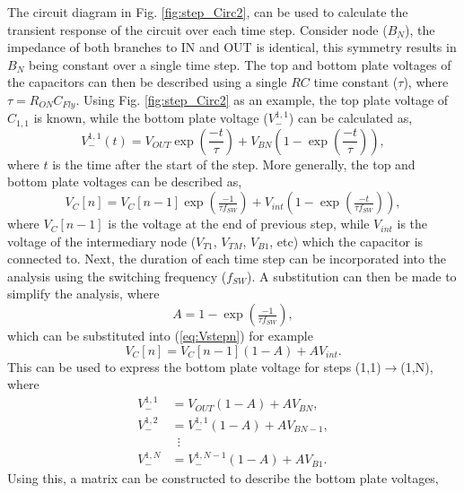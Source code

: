 \documentclass[conference]{IEEEtran}
\begin{document}
	The circuit diagram in Fig. \ref{fig:step_Circ2}, can be used to calculate the transient response of the circuit over each time step. Consider node ($B_N$),  the impedance of both branches to IN and OUT is identical, this symmetry results in $B_N$ being constant over a single time step. The top and bottom plate voltages of the capacitors can then be described using a single $RC$ time constant ($\tau$), where $\tau = R_{ON}C_{Fly}$. Using Fig. \ref{fig:step_Circ2} as an example, the top plate voltage of $C_{1,1}$ is known, while the bottom plate voltage ($V_{-}^{1,1}$) can be calculated as,
	\begin{equation}
	V_{-}^{1,1}(t) = V_{OUT}\exp\left(\frac{-t}{\tau}\right) + V_{BN}\left(1-\exp\left(\frac{-t}{\tau}\right)\right),
	\end{equation}
	where $t$ is the time after the start of the step. More generally, the top and bottom plate voltages can be described as,
	\begin{equation}
	V_{C}[n]\! =\! V_{C}[n\!-\!1]\exp\left(\tfrac{-1}{\tau f_{SW}}\right) + V_{int}\!\left(1-\exp\left(\tfrac{-t}{\tau f_{SW}}\right)\right),
	\label{eq:Vstepn}
	\end{equation}
	where $V_{C}[n-1]$ is the voltage at the end of previous step, while $V_{int}$ is the voltage of the intermediary node ($V_{T1}$, $V_{TM}$, $V_{B1}$, etc) which the capacitor is connected to. Next, the duration of each time step can be incorporated into the analysis using the switching frequency ($f_{SW}$). A substitution can then be made to simplify the analysis, where
	\begin{equation}
	A = 1-\exp\left(\tfrac{-1}{\tau f_{SW}}\right),
	\label{eq:A}
	\end{equation}
	which can be substituted into (\ref{eq:Vstepn}) for example
	\begin{equation}
		V_{C}[n] = V_C[n-1](1-A) + AV_{int}.
	\end{equation}
	This can be used to express the bottom plate voltage for steps (1,1)$\rightarrow $(1,N), where
	\begin{equation}
	\begin{split}
	V_-^{1,1} &= V_{OUT}(1-A) + AV_{BN},\\
	V_-^{1,2} &= V_-^{1,1}(1-A) + AV_{BN-1},\\
	& \,\,\,\vdots\\
	V_{-}^{1,N} &= V_-^{1,N-1}(1-A) + AV_{B1}.
	\end{split}		
	\end{equation}
	Using this, a matrix can be constructed to describe the bottom plate voltages,
	
\end{document}
